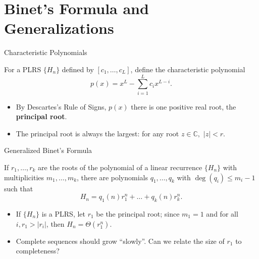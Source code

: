 \documentclass[handout]{beamer}
\newcommand{\C}{\mathbb{C}}
\begin{document}
\section{Binet's Formula and Generalizations}

\begin{frame}{Characteristic Polynomials}
\begin{definition}
	For a PLRS $\{ H_{n} \}$ defined by $[c_1,\ldots , c_{L}]$,  define the characteristic polynomial
	\[
	p(x)=x^{L}-\sum_{i=1}^{L}c_{i}x^{L-i}
	.\] 
\end{definition}
\pause
\begin{itemize}
\item
 By Descartes's Rule of Signs, $p(x)$ there is one positive real root, the \textbf{principal root}. 
 \pause
\item
The principal root is always the largest: for any root $z\in \C,$ $\left| z \right|<r$. 
\end{itemize}

\end{frame}


\begin{frame}{Generalized Binet's Formula}

\begin{theorem}
If $r_1,\ldots , r_{k}$ are the roots of the polynomial of a linear recurrence $\{ H_{n} \}$ with multiplicities  $m_1,\ldots , m_{k}$, there are polynomials $q_1,\ldots , q_{k}$ with $\deg (q_i) \leq m_{i}-1$ such that \[
	H_{n}=q_1(n)r_1^{n}+\ldots +q_{k}(n)r_{k}^{n}
.\] 

\end{theorem}
\pause
	\begin{itemize}
\item
	If $\{ H_{n} \}$ is a PLRS, let $r_1$ be the principal root; since $m_1=1$ and for all $ i, r_1>|r_{i}|$, then $H_{n}=\Theta(r_1^{n})$.
	\item Complete sequences should grow ``slowly''. Can we relate the size of $r_1$ to completeness?
\end{itemize}
\end{frame}
\end{document}
